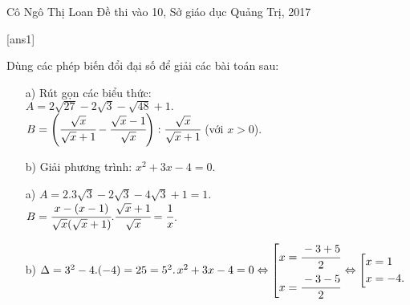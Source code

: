 \begin{name}
{Cô Ngô Thị Loan}
{Đề thi vào 10, Sở giáo dục Quảng Trị, 2017}
\end{name}
\setcounter{ex}{0}
[ans1]
\begin{ex}%
   Dùng các phép biến đổi đại số để giải các bài toán sau:
    \begin{enumerate}
        \item[a)] Rút gọn các biểu thức:
     \\ $ A=2\sqrt{27}-2\sqrt{3}-\sqrt{48}+1. $
     \\ $ B=\left( \cfrac{\sqrt{x}}{\sqrt{x}+1} - \cfrac{\sqrt{x}-1}{\sqrt{x}}\right) : \cfrac{\sqrt{x}}{\sqrt{x}+1} $ (với $ x>0 $).
        \item[b)] Giải phương trình: $ x^2+3x-4=0 $.
    \end{enumerate}
\loigiai
    {
    \begin{enumerate}
        \item[a)] $A=2.3\sqrt{3}-2\sqrt{3}-4\sqrt{3}+1=1$.
        \\ $ B= \cfrac{x-(x-1)}{\sqrt{x} (\sqrt{x}+1)}. \cfrac{\sqrt{x}+1}{\sqrt{x}}= \cfrac{1}{x} $.
        \item[b)] 
        $ \Delta = 3^2-4.(-4)=25=5^2.
        \\ $$x^2+3x-4=0 \Leftrightarrow \left[\begin{aligned}&x=\cfrac{-3+5}{2}\\ &x=\cfrac{-3-5}{2}\end{aligned}\right. \Leftrightarrow \left[\begin{aligned}&x=1 \\ &x=-4.\end{aligned}\right.$
        
    \end{enumerate}
    }
\end{ex}

